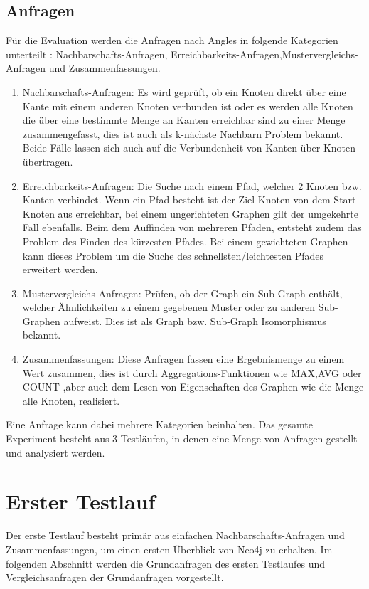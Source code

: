 \subsection{Anfragen} \label{Kategorien}
Für die Evaluation werden die Anfragen nach  Angles in folgende Kategorien unterteilt \parencite{angles2012comparison}: Nachbarschafts-Anfragen, Erreichbarkeits-Anfragen,Mustervergleichs-Anfragen und  Zusammenfassungen. 
\begin{enumerate}
	\item Nachbarschafts-Anfragen: Es wird geprüft, ob ein Knoten direkt über eine  Kante mit einem anderen Knoten verbunden ist oder  es werden alle Knoten die über eine bestimmte Menge an Kanten erreichbar sind zu einer Menge zusammengefasst, dies ist auch als k-nächste Nachbarn Problem bekannt. Beide Fälle lassen sich auch auf die Verbundenheit von Kanten über Knoten übertragen.
	\item Erreichbarkeits-Anfragen: Die Suche nach einem Pfad, welcher 2 Knoten bzw. Kanten verbindet. Wenn ein Pfad besteht ist der Ziel-Knoten von dem Start-Knoten aus erreichbar, bei einem ungerichteten Graphen gilt der umgekehrte Fall ebenfalls. Beim dem Auffinden von mehreren Pfaden, entsteht zudem das Problem des Finden des kürzesten Pfades. Bei einem gewichteten Graphen kann dieses Problem um die Suche des schnellsten/leichtesten Pfades  erweitert werden. 
	\item Mustervergleichs-Anfragen: Prüfen, ob der Graph ein Sub-Graph enthält, welcher Ähnlichkeiten zu einem gegebenen Muster oder zu anderen Sub-Graphen aufweist. Dies ist als Graph bzw. Sub-Graph Isomorphismus bekannt. 
	\item Zusammenfassungen: Diese Anfragen fassen eine Ergebnismenge zu einem Wert zusammen, dies ist durch Aggregations-Funktionen wie MAX,AVG oder COUNT ,aber auch dem Lesen von Eigenschaften des Graphen wie die Menge alle Knoten, realisiert. 
\end{enumerate}
Eine Anfrage kann dabei mehrere Kategorien beinhalten. Das gesamte Experiment besteht aus 3 Testläufen, in denen eine Menge von Anfragen gestellt und analysiert werden. 
\section{Erster Testlauf}
Der erste Testlauf besteht primär aus einfachen Nachbarschafts-Anfragen und Zusammenfassungen, um einen ersten Überblick von Neo4j zu erhalten. Im folgenden Abschnitt werden die Grundanfragen des ersten Testlaufes und Vergleichsanfragen der Grundanfragen vorgestellt. 
